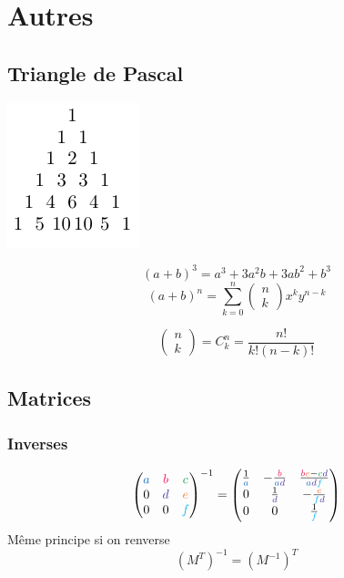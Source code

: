 \documentclass[resume]{subfiles}
\begin{document}
\section{Autres}
\subsection{Triangle de Pascal}
\begin{center}
\includegraphics[scale=1,page=1]{drwg_1.pdf}
\end{center}
$$(a+b)^3=a^3+3a^2b+3ab^2+b^3$$
$$(a+b)^n=\sum_{k=0}^{n}\begin{pmatrix}
n\\k
\end{pmatrix}x^ky^{n-k}$$

$$\begin{pmatrix}
n\\ k
\end{pmatrix}=C^{n}_{k}=\frac{n!}{k!(n-k)!}$$
\subsection{Matrices}
\subsubsection{Inverses}
$$\begin{pmatrix}
\textcolor{RoyalBlue}{a} & \textcolor{OrangeRed}{b} & \textcolor{ForestGreen}{c}\\
0 & \textcolor{Violet}{d} & \textcolor{Orange}{e}\\
0 & 0 & \textcolor{ProcessBlue}{f}
\end{pmatrix}^{-1}=\begin{pmatrix}
\frac{1}{\textcolor{RoyalBlue}{a}} & -\frac{\textcolor{OrangeRed}{b}}{\textcolor{RoyalBlue}{a}\textcolor{Violet}{d}} & \frac{\textcolor{OrangeRed}{b}\textcolor{Orange}{e}-\textcolor{ForestGreen}{c}\textcolor{Violet}{d}}{\textcolor{RoyalBlue}{a}\textcolor{Violet}{d}\textcolor{ProcessBlue}{f}}\\
0 & \frac{1}{\textcolor{Violet}{d}} & -\frac{\textcolor{Orange}{e}}{\textcolor{ProcessBlue}{f}\textcolor{Violet}{d}}\\
0 & 0 & \frac{1}{\textcolor{ProcessBlue}{f}}
\end{pmatrix}$$
Même principe si on renverse
$$\left(M^{T}\right)^{-1}=\left(M^{-1}\right)^{T}$$
\end{document}
